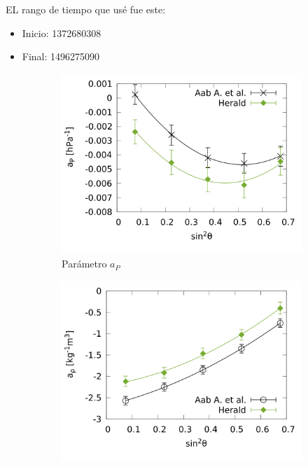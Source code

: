       EL rango de tiempo que usé fue este: 
      \begin{itemize}
        \item Inicio: 1372680308
        \item Final: 1496275090
      \end{itemize}
        \begin{figure}[H]
          \begin{subfigure}[b]{0.5\textwidth}
          \includegraphics[width=\linewidth]{../0_Introduccion/params/ap_2017_above_1EeV.png}
          \caption{Parámetro $a_P$ }
          \label{fig:ap_2017_1EeV}
          \end{subfigure}%
          \hspace{\fill}
          \begin{subfigure}[b]{0.5\textwidth}
          \includegraphics[width=\linewidth]{../0_Introduccion/params/arho_2017_above_1EeV.png}

\end{subfigure}
\end{figure}

